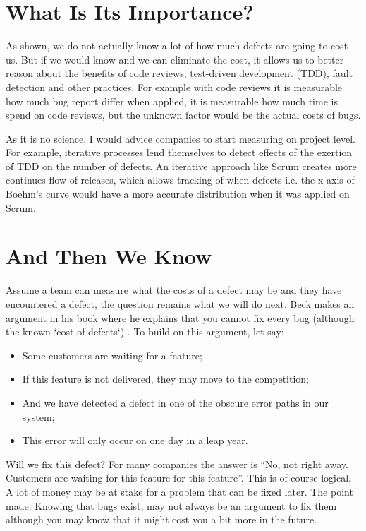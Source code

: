 \section*{What Is Its Importance?}

As shown, we do not actually know a lot of how much defects are going to cost us.
But if we would know and we can eliminate the cost, it allows us to better reason about the benefits of code reviews, test-driven development (TDD), fault detection and other practices.
For example with code reviews it is measurable how much bug report differ when applied, it is measurable how much time is spend on code reviews, but the unknown factor would be the actual costs of bugs.

As it is no science, I would advice companies to start measuring on project level. For example, iterative processes lend themselves to detect effects of the exertion of TDD on the number of defects.
An iterative approach like Scrum creates more continues flow of releases, which allows tracking of when defects i.e. the x-axis of Boehm's curve would have a more accurate distribution when it was applied on Scrum.

\section*{And Then We Know}

Assume a team can measure what the costs of a defect may be and they have encountered a defect, the question remains what we will do next.
Beck makes an argument in his book where he explains that you cannot fix every bug (although the known `cost of defects`) \autocite[22]{beck2000extreme}.
To build on this argument, let say:
\begin{itemize}[noitemsep]
\item Some customers are waiting for a feature;
\item If this feature is not delivered, they may move to the competition;
\item And we have detected a defect in one of the obscure error paths in our system;
\item This error will only occur on one day in a leap year.
\end{itemize}
Will we fix this defect? For many companies the answer is ``No, not right away. Customers are waiting for this feature for this feature''.
This is of course logical. A lot of money may be at stake for a problem that can be fixed later.
The point made: Knowing that bugs exist, may not always be an argument to fix them although you may know that it might cost you a bit more in the future.

